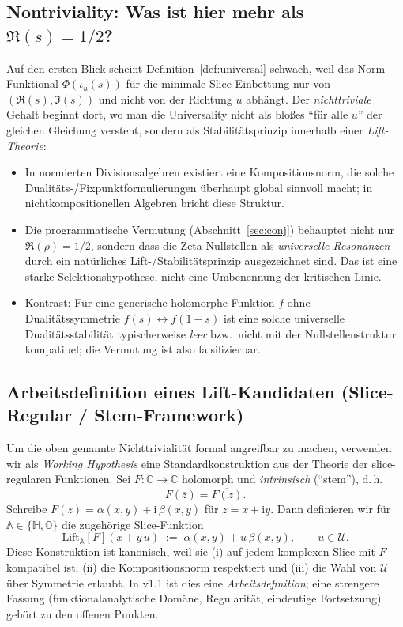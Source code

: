 \documentclass[11pt,a4paper]{article}
\theoremstyle{plain}
\theoremstyle{definition}
\theoremstyle{remark}
\newcommand{\C}{\mathbb{C}}
\newcommand{\Hh}{\mathbb{H}}
\newcommand{\Okt}{\mathbb{O}}
\newcommand{\ii}{\mathrm{i}}
\begin{document}
\subsection*{Nontriviality: Was ist hier mehr als $\Re(s)=1/2$?}
Auf den ersten Blick scheint Definition~\ref{def:universal} schwach, weil das Norm-Funktional $\Phi(\iota_u(s))$
für die minimale Slice-Einbettung nur von $(\Re(s),\Im(s))$ und nicht von der Richtung $u$ abhängt.
Der \emph{nichttriviale} Gehalt beginnt dort, wo man die Universality nicht als bloßes
``für alle $u$'' der gleichen Gleichung versteht, sondern als Stabilitätsprinzip innerhalb einer
\emph{Lift-Theorie}:
\begin{itemize}
\item In normierten Divisionsalgebren existiert eine Kompositionsnorm, die solche Dualitäts-/Fixpunktformulierungen
      überhaupt global sinnvoll macht; in nichtkompositionellen Algebren bricht diese Struktur.
\item Die programmatische Vermutung (Abschnitt~\ref{sec:conj}) behauptet nicht nur $\Re(\rho)=1/2$,
      sondern dass die Zeta-Nullstellen als \emph{universelle Resonanzen} durch ein natürliches Lift-/Stabilitätsprinzip
      ausgezeichnet sind. Das ist eine starke Selektionshypothese, nicht eine Umbenennung der kritischen Linie.
\item Kontrast: Für eine generische holomorphe Funktion $f$ ohne Dualitätssymmetrie $f(s)\leftrightarrow f(1-s)$
      ist eine solche universelle Dualitätsstabilität typischerweise \emph{leer} bzw.\ nicht mit der Nullstellenstruktur
      kompatibel; die Vermutung ist also falsifizierbar.
\end{itemize}

\subsection*{Arbeitsdefinition eines Lift-Kandidaten (Slice-Regular / Stem-Framework)}
Um die oben genannte Nichttrivialität formal angreifbar zu machen, verwenden wir als \emph{Working Hypothesis}
eine Standardkonstruktion aus der Theorie der slice-regularen Funktionen.
Sei $F:\C\to\C$ holomorph und \emph{intrinsisch} (``stem''), d.\,h.
\[
F(\overline{z})=\overline{F(z)}.
\]
Schreibe $F(z)=\alpha(x,y)+\ii\,\beta(x,y)$ für $z=x+\ii y$.
Dann definieren wir für $\mathbb A\in\{\Hh,\Okt\}$ die zugehörige Slice-Funktion
\[
\mathrm{Lift}_{\mathbb A}[F](x+y\,u)\;:=\;\alpha(x,y)+u\,\beta(x,y),\qquad u\in\mathcal U.
\]
Diese Konstruktion ist kanonisch, weil sie (i) auf jedem komplexen Slice mit $F$ kompatibel ist,
(ii) die Kompositionsnorm respektiert und (iii) die Wahl von $\mathcal U$ über Symmetrie erlaubt.
In v1.1 ist dies eine \emph{Arbeitsdefinition}; eine strengere Fassung (funktionalanalytische Domäne,
Regularität, eindeutige Fortsetzung) gehört zu den offenen Punkten.
\end{document}
